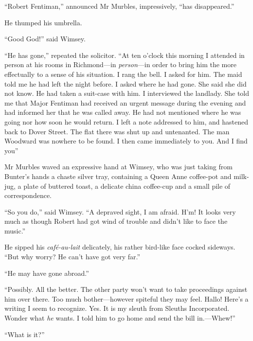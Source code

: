 \enquote{Robert Fentiman,} announced Mr Murbles, impressively, \enquote{has disappeared.}

He thumped his umbrella.

\enquote{Good God!} said Wimsey.

\enquote{He has gone,} repeated the solicitor. \enquote{At ten o'clock this morning I attended in person at his rooms in Richmond\allowbreak---\allowbreak in \textit{person}---in order to bring him the more effectually to a sense of his situation. I rang the bell. I asked for him. The maid told me he had left the night before. I asked where he had gone. She said she did not know. He had taken a suit-case with him. I interviewed the landlady. She told me that Major Fentiman had received an urgent message during the evening and had informed her that he was called away. He had not mentioned where he was going nor how soon he would return. I left a note addressed to him, and hastened back to Dover Street. The flat there was shut up and untenanted. The man Woodward was nowhere to be found. I then came immediately to you. And I find you\longdash}

Mr Murbles waved an expressive hand at Wimsey, who was just taking from Bunter's hands a chaste silver tray, containing a Queen Anne coffee-pot and milk-jug, a plate of buttered toast, a delicate china coffee-cup and a small pile of correspondence.

\enquote{So you do,} said Wimsey. \enquote{A depraved sight, I am afraid. H'm! It looks very much as though Robert had got wind of trouble and didn't like to face the music.}

He sipped his \textit{café-au-lait} delicately, his rather bird-like face cocked sideways. \enquote{But why worry? He can't have got very far.}

\enquote{He may have gone abroad.}

\enquote{Possibly. All the better. The other party won't want to take proceedings against him over there. Too much bother\allowbreak---\allowbreak however spiteful they may feel. Hallo! Here's a writing I seem to recognize. Yes. It is my sleuth from Sleuths Incorporated. Wonder what \textit{he} wants. I told him to go home and send the bill in.---Whew!}

\enquote{What is it?}

